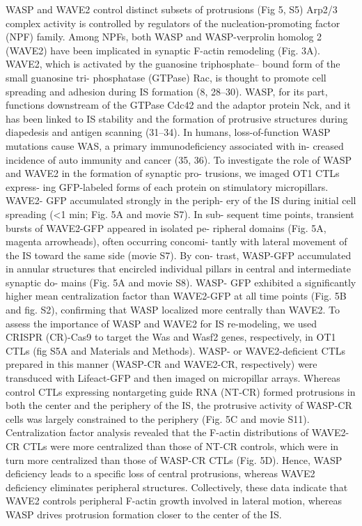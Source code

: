 WASP and WAVE2 control distinct subsets of protrusions (Fig 5, S5)
Arp2/3 complex activity is controlled by regulators of the nucleation-promoting factor (NPF) family. Among NPFs, both WASP and WASP-verprolin homolog 2 (WAVE2) have been implicated in synaptic F-actin remodeling (Fig. 3A). WAVE2, which is activated by the guanosine triphosphate– bound form of the small guanosine tri- phosphatase (GTPase) Rac, is thought to promote cell spreading and adhesion during IS formation (8, 28–30). WASP, for its part, functions downstream of the GTPase Cdc42 and the adaptor protein Nck, and it has been linked to IS stability and the formation of protrusive structures during diapedesis and antigen scanning (31–34). In humans, loss-of-function WASP mutations cause WAS, a primary immunodeficiency associated with in- creased incidence of auto immunity and cancer (35, 36).
To investigate the role of WASP and WAVE2 in the formation of synaptic pro- trusions, we imaged OT1 CTLs express- ing GFP-labeled forms of each protein on stimulatory micropillars. WAVE2- GFP accumulated strongly in the periph- ery of the IS during initial cell spreading (<1 min; Fig. 5A and movie S7). In sub- sequent time points, transient bursts of WAVE2-GFP appeared in isolated pe- ripheral domains (Fig. 5A, magenta arrowheads), often occurring concomi- tantly with lateral movement of the IS toward the same side (movie S7). By con- trast, WASP-GFP accumulated in annular structures that encircled individual pillars in central and intermediate synaptic do- mains (Fig. 5A and movie S8). WASP- GFP exhibited a significantly higher mean centralization factor than WAVE2-GFP at all time points (Fig. 5B and fig. S2), confirming that WASP localized more centrally than WAVE2. To assess the importance of WASP and WAVE2 for IS re-modeling, we used CRISPR (CR)-Cas9 to target the Was and Wasf2 genes, respectively, in OT1 CTLs (fig S5A and Materials and Methods). WASP- or WAVE2-deficient CTLs prepared in this manner (WASP-CR and WAVE2-CR, respectively) were transduced with Lifeact-GFP and then imaged on micropillar arrays. Whereas control CTLs expressing nontargeting guide RNA (NT-CR) formed protrusions in both the center and the periphery of the IS, the protrusive activity of WASP-CR cells was largely constrained to the periphery (Fig. 5C and movie S11). Centralization factor analysis revealed that the F-actin distributions of WAVE2-CR CTLs were more centralized than those of NT-CR controls, which were in turn more centralized than those of WASP-CR CTLs (Fig. 5D). Hence, WASP deficiency leads to a specific loss of central protrusions, whereas WAVE2 deficiency eliminates peripheral structures. Collectively, these data indicate that WAVE2 controls peripheral F-actin growth involved in lateral motion, whereas WASP drives protrusion formation closer to the center of the IS.

